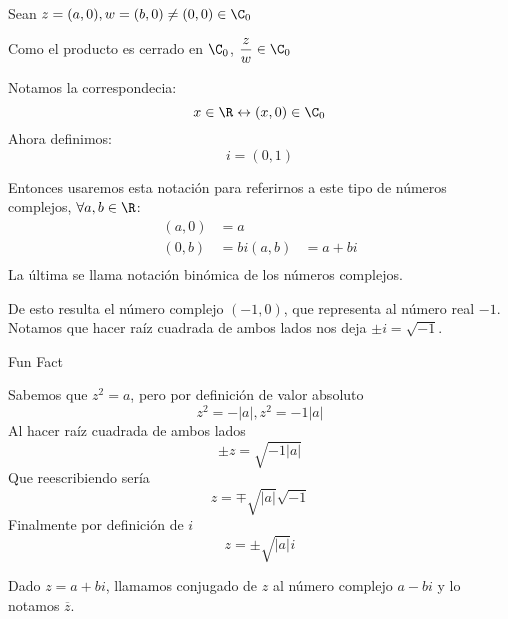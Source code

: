 \documentclass[10pt]{article}
\begin{document}
\begin{prf}{}
	Sean $z = (a,0), w = (b,0) \neq (0,0) \in \C_0$\\


	Como el producto es cerrado en $\C_0$, $\dfrac{z}{w} \in \C_0$
\end{prf}
Notamos la correspondecia:
$$x \in \R \leftrightarrow (x,0) \in \C_0$$
Ahora definimos:
$$i = (0,1)$$
\begin{prf}{}
\end{prf}
Entonces usaremos esta notación para referirnos a este tipo de números complejos, $\forall a,b \in \R$:
\begin{align}
	(a,0) &= a\\
	(0,b) &= bi
	(a,b) &= a+bi\\
\end{align}
La última se llama notación binómica de los números complejos.
\begin{prf}[$i^2 = -1$]{}
	De esto resulta el número complejo $(-1,0)$, que representa al número real $-1$.
	Notamos que hacer raíz cuadrada de ambos lados nos deja $\pm i = \sqrt{-1}$.
\end{prf}

Fun Fact
\begin{prf}[$a \in \R, a < 0, z^2 = a \Leftrightarrow z = \pm\sqrt{|a|}i$]{}
	Sabemos que $z^2 = a$, pero por definición de valor absoluto
	$$z^2 = -|a|, z^2 = -1|a|$$
	Al hacer raíz cuadrada de ambos lados
	$$\pm z = \sqrt{-1|a|}$$
	Que reescribiendo sería
	$$z = \mp \sqrt{|a|}\sqrt{-1}$$
	Finalmente por definición de $i$
	$$z = \pm \sqrt{|a|}i$$

\end{prf}
Dado $z = a + bi$, llamamos conjugado de $z$ al número complejo $a-bi$ y lo notamos $\overline{z}$.
\end{document}
